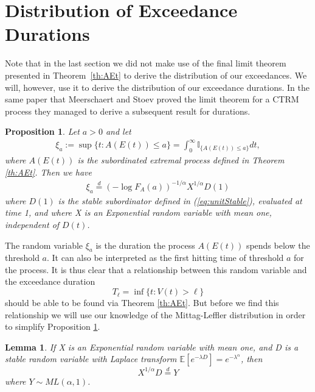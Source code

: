 \documentclass[honours,12pt,twoside, openright]{unswthesis}
\newcommand{\E}{\mathbb{E}}
\newcommand{\1}{\mathbf 1}
\newtheorem{lemma}[equation]{Lemma}
\newtheorem{proposition}[equation]{Proposition}
\numberwithin{equation}{section}
\theoremstyle{definition}
\theoremstyle{remark}
\begin{document}
\section{Distribution of Exceedance Durations}
Note that in the last section we did not make use of the final limit theorem presented in Theorem~\ref{th:AEt} to derive the distribution of our exceedances. We will, however, use it to derive the distribution of our exceedance durations. In the same paper that Meerschaert and Stoev proved the limit theorem for a CTRM process they managed to derive a subsequent result for durations.
\begin{proposition}\cite{MeerschaertStoev08}\label{prop:extremalDuration}
Let $a>0$ and let 
\begin{align}
	\xi_a:=\sup\{t:A(E(t))\leq a \} =\int^\infty_0 \mathbb{I}_{\{A(E(t))\leq a\}}dt,
\end{align}
where $A(E(t))$ is the subordinated extremal process defined in Theorem \ref{th:AEt}. Then we have
\begin{align}
	\xi_a \overset{d}{=} (-\log F_A(a))^{-1/\alpha}X^{1/\alpha}D(1)
\end{align}
where $D(1)$ is the stable subordinator defined in (\ref{eq:unitStable}), evaluated at time 1, and where X is an Exponential random variable with mean one, independent of $D(t)$.
\end{proposition}
The random variable $\xi_a$ is the duration the process $A(E(t))$ spends below the threshold $a$. It can also be interpreted as the first hitting time of threshold $a$ for the process. It is thus clear that a relationship between this random variable and the exceedance duration
\[
T_\ell = \inf\{t: V(t) > \ell\}
\]
should be able to be found via Theorem \ref{th:AEt}. But before we find this relationship we will use our knowledge of the Mittag-Leffler distribution in order to simplify Proposition \ref{prop:extremalDuration}.\\
\begin{lemma}\cite{Anderson1987}
If X is an Exponential random variable with mean one, and D is a stable random variable with Laplace transform $\E[e^{-\lambda D}] = e^{-\lambda^\alpha}$, then
\[
	X^{1/\alpha}D\overset{d}{=}Y
\]
where $Y\sim ML(\alpha,1)$.
\end{lemma}
\end{document}
